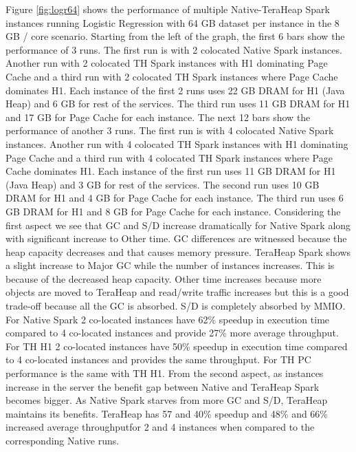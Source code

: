 Figure \ref{fig:logr64} shows the performance of multiple
Native-TeraHeap Spark instances running Logistic Regression with 64 GB
dataset per instance in the 8 GB / core scenario.
Starting from the left of the graph, the first 6 bars show the
performance of 3 runs. The first run is with 2 colocated Native Spark instances.
Another run with 2 colocated TH Spark instances with H1 dominating Page Cache
and a third run with 2 colocated TH Spark instances where Page Cache dominates H1.
Each instance of the first 2 runs uses 22 GB DRAM for H1 (Java Heap) and 6 GB for rest of the services.
The third run uses 11 GB DRAM for H1 and 17 GB for Page Cache for each instance. 
The next 12 bars show the performance of another 3 runs. The first run is with 4 colocated Native Spark instances.
Another run with 4 colocated TH Spark instances with H1 dominating Page Cache
and a third run with 4 colocated TH Spark instances where Page Cache dominates H1.
Each instance of the first run uses 11 GB DRAM for H1 (Java Heap) and 3 GB for rest of the services.
The second run uses 10 GB DRAM for H1 and 4 GB for Page Cache for each instance.
The third run uses 6 GB DRAM for H1 and 8 GB for Page Cache for each instance.
Considering the first aspect we see that GC and S/D increase dramatically for Native Spark along with significant increase to Other time. GC differences are witnessed because the heap capacity decreases and that causes memory pressure. TeraHeap Spark shows a slight increase to Major GC while the number of instances increases. This is because of the decreased heap capacity. Other time increases because more objects are moved to TeraHeap and read/write traffic increases but this is a good trade-off because all the GC is absorbed. S/D is completely absorbed by MMIO. For Native Spark 2 co-located instances have 62\% speedup in execution time compared to 4 co-located instances and provide 27\% more average throughput. For TH H1 2 co-located instances have 50\% speedup in execution time compared to 4 co-located instances and provides the same throughput. For TH PC performance is the same with TH H1. From the second aspect, as instances increase in the server the benefit gap between Native and TeraHeap Spark becomes bigger. As Native Spark starves from more GC and S/D, TeraHeap maintains its benefits. TeraHeap has 57 and 40\% speedup and 48\% and 66\% increased average throughputfor 2 and 4 instances when compared to the corresponding Native runs.


